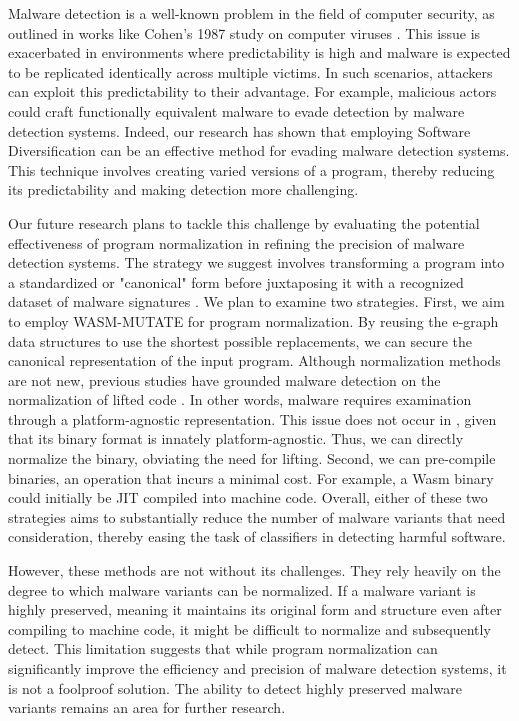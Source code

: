 \begin{strategy}

    Malware detection is a well-known problem in the field of computer security, as outlined in works like Cohen's 1987 study on computer viruses \cite{cohen1987computer}. 
    This issue is exacerbated in environments where predictability is high and malware is expected to be replicated identically across multiple victims. 
    In such scenarios, attackers can exploit this predictability to their advantage. 
    For example, malicious actors could craft functionally equivalent malware to evade detection by malware detection systems.
    Indeed, our research has shown that employing Software Diversification can be an effective method for evading malware detection systems. 
    This technique involves creating varied versions of a program, thereby reducing its predictability and making detection more challenging. 
   
        
    Our future research plans to tackle this challenge by evaluating the potential effectiveness of program normalization in refining the precision of malware detection systems. 
    The strategy we suggest involves transforming a program into a standardized or "canonical" form before juxtaposing it with a recognized dataset of malware signatures \cite{seideman2023transformation}. 
    We plan to examine two strategies. 
    First, we aim to employ WASM-MUTATE for program normalization. 
    By reusing the e-graph data structures to use the shortest possible replacements, we can secure the canonical representation of the input program. 
    Although normalization methods are not new, previous studies have grounded malware detection on the normalization of lifted code \cite{Huang2017BinSequenceFA, 6234404, 10.1007/978-3-030-78120-0_5}. 
    In other words, malware requires examination through a platform-agnostic representation. 
    This issue does not occur in \Wasm, given that its binary format is innately platform-agnostic. 
    Thus, we can directly normalize the \Wasm binary, obviating the need for lifting. 
    Second, we can pre-compile \Wasm binaries, an operation that incurs a minimal cost. 
    For example, a Wasm binary could initially be JIT compiled into machine code. 
    Overall, either of these two strategies aims to substantially reduce the number of malware variants that need consideration, thereby easing the task of classifiers in detecting harmful software. 

    However, these methods are not without its challenges. 
    They rely heavily on the degree to which malware variants can be normalized.
    If a malware variant is highly preserved, meaning it maintains its original form and structure even after compiling to machine code, it might be difficult to normalize and subsequently detect. 
    This limitation suggests that while program normalization can significantly improve the efficiency and precision of malware detection systems, it is not a foolproof solution. 
    The ability to detect highly preserved malware variants remains an area for further research.
    

\end{strategy}


